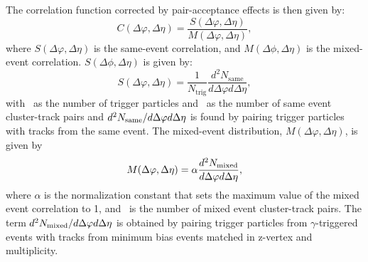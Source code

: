 The correlation function corrected by pair-acceptance effects is then given by:
\begin{equation}
  \label{eq:Y}
  C(\Delta \varphi, \Delta \eta) = \frac{S(\Delta \varphi, \Delta \eta)}{M(\Delta \varphi, \Delta \eta)},
\end{equation}
where $S(\Delta \varphi, \Delta \eta)$ is the same-event correlation, and $M(\Delta \phi, \Delta \eta)$ is the mixed-event correlation. $S(\Delta \phi, \Delta \eta)$ is given by: 
\begin{equation}
  S(\Delta \varphi, \Delta \eta) = \frac{1}{N_{\mathrm{trig}}}\frac{d^2N_{\mathrm{same}}}{d\Delta \varphi d\Delta \eta},
\end{equation}
with \Ntrig~as the number of trigger particles and \Nsame~as the number of same event cluster-track pairs and $d^2N_{\mathrm{same}}/d\Delta \varphi d\Delta \eta$ is found by pairing trigger particles with tracks from the same event. The mixed-event distribution, $M(\Delta \varphi, \Delta \eta)$, is given by 
\begin{equation}
  M(\Delta \varphi, \Delta \eta) = \alpha \frac{d^2 N_{\mathrm{mixed}}}{d\Delta \varphi d\Delta \eta},
\end{equation}
where $\alpha$ is the normalization constant that sets the maximum value of the mixed event correlation to 1, and \Nmixed~is the number of mixed event cluster-track pairs. The term $d^2 N_{\mathrm{mixed}}/d\Delta \varphi d\Delta \eta$ is obtained by pairing trigger particles from \(\gamma\)-triggered events with tracks from minimum bias events matched in z-vertex and multiplicity.



